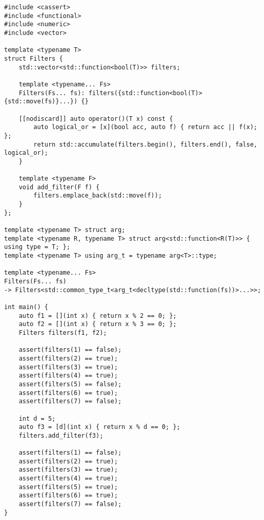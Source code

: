 \begin{lstlisting}[title=\href{https://godbolt.org/z/wcA5DK}{\texttt{godbolt.org/z/wcA5DK}}]
#include <cassert>
#include <functional>
#include <numeric>
#include <vector>

template <typename T>
struct Filters {
    std::vector<std::function<bool(T)>> filters;

    template <typename... Fs>
    Filters(Fs... fs): filters({std::function<bool(T)>{std::move(fs)}...}) {}

    [[nodiscard]] auto operator()(T x) const {
        auto logical_or = [x](bool acc, auto f) { return acc || f(x); };
        return std::accumulate(filters.begin(), filters.end(), false, logical_or);
    }

    template <typename F>
    void add_filter(F f) {
        filters.emplace_back(std::move(f));
    }  
};

template <typename T> struct arg;
template <typename R, typename T> struct arg<std::function<R(T)>> { using type = T; };
template <typename T> using arg_t = typename arg<T>::type;

template <typename... Fs>
Filters(Fs... fs)
-> Filters<std::common_type_t<arg_t<decltype(std::function(fs))>...>>;

int main() {
    auto f1 = [](int x) { return x % 2 == 0; };
    auto f2 = [](int x) { return x % 3 == 0; };
    Filters filters(f1, f2);

    assert(filters(1) == false);
    assert(filters(2) == true);
    assert(filters(3) == true);
    assert(filters(4) == true);
    assert(filters(5) == false);
    assert(filters(6) == true);
    assert(filters(7) == false);

    int d = 5;
    auto f3 = [d](int x) { return x % d == 0; };
    filters.add_filter(f3);

    assert(filters(1) == false);
    assert(filters(2) == true);
    assert(filters(3) == true);
    assert(filters(4) == true);
    assert(filters(5) == true);
    assert(filters(6) == true);
    assert(filters(7) == false);
}
\end{lstlisting}
